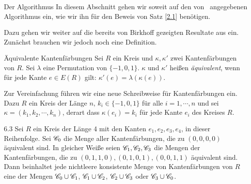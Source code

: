 \begin{section}{Der Algorithmus}
 In diesem Abschnitt gehen wir soweit auf den von \rsst\-\  angegebenen Algorithmus ein, wie wir ihn für den Beweis von Satz \ref{2.1} benötigen.
 
 Dazu gehen wir weiter auf die bereits von Birkhoff gezeigten Resultate aus \cite{AmJMath35} ein. Zunächst brauchen wir jedoch noch eine Definition.
 
 \begin{definition}{Äquivalente Kantenfärbungen}
  Sei $R$ ein Kreis und $\kappa,\kappa'$ zwei Kantenfärbungen von $R$. Sei $\lambda$ eine Permutation von $\{-1,0,1\}$. $\kappa$ und $\kappa'$ heißen \textit{äquivalent}, wenn für jede Kante $e\in E(R)$ gilt: $\kappa'(e) = \lambda(\kappa(e))$.
 \end{definition}

 Zur Vereinfachung führen wir eine neue Schreibweise für Kantenfärbungen ein. Dazu $R$ ein Kreis der Länge $n$, $k_i \in \{-1,0,1\}$ für alle $i = 1,\cdots,n$ und sei $\kappa = (k_1,k_2,\cdots,k_n)$, derart dass $\kappa(e_i) = k_i$ für jede Kante $e_i$ des Kreises $R$.
 
 \begin{lemmal}{ }{6.3}
  Sei $R$ ein Kreis der Länge 4 mit den Kanten $e_1,e_2,e_3,e_4$, in dieser Reihenfolge. Sei $\mathscr{C}_0$ die Menge aller Kantenfärbungen, die zu $(0,0,0,0)$ äquivalent sind. In gleicher Weiße seien $\mathscr{C}_1,\mathscr{C}_2,\mathscr{C}_3$ die Mengen der Kantenfärbungen, die zu $(0,1,1,0),(0,1,0,1),(0,0,1,1)$ äquivalent sind. Dann beinhaltet jede nichtleere konsistente Menge von Kantenfärbungen von $R$ eine der Mengen $\mathscr{C}_0 \cup \mathscr{C}_1$, $\mathscr{C}_1 \cup \mathscr{C}_2$, $\mathscr{C}_2 \cup \mathscr{C}_3$ oder $\mathscr{C}_3 \cup \mathscr{C}_0$.
 \end{lemmal}
 

\end{section}
